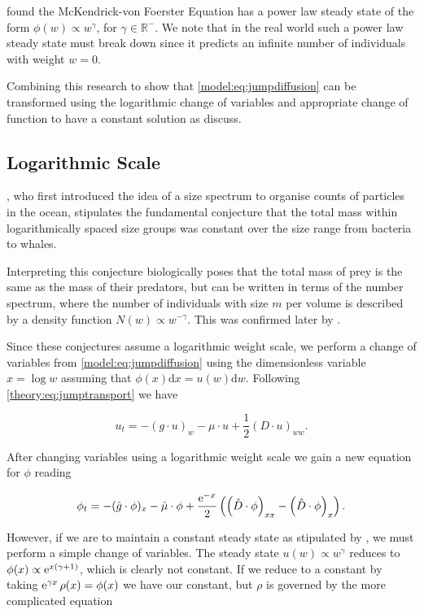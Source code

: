 \documentclass[../main]{subfiles}
\begin{document}
  \cite{benoit2004} found the McKendrick-von Foerster Equation has a power law steady state of the form $\phi(w) \propto w^{\gamma}$, for $\gamma \in \mathbb{R}^-$. We note that in the real world such a power law steady state must break down since it predicts an infinite number of individuals with weight $w = 0$.

  Combining this research to show that \autoref{model:eq:jumpdiffusion} can be transformed using the logarithmic change of variables and appropriate change of function to have a constant solution as \cite{benoit2004} discuss.

  \subsection{Logarithmic Scale}
  \cite{sheldon1967}, who first introduced the idea of a size spectrum to organise counts of particles in the ocean, stipulates the fundamental conjecture that the total mass within logarithmically spaced size groups was constant over the size range from bacteria to whales.

  Interpreting this conjecture biologically \cite{silvert1980} poses that the total mass of prey is the same as the mass of their predators, but can be written in terms of the number spectrum, where the number of individuals with size $m$ per volume is described by a density function $N(w) \propto w^{-\gamma}$. This was confirmed later by \cite{benoit2004}.

  Since these conjectures assume a logarithmic weight scale, we perform a change of variables from \autoref{model:eq:jumpdiffusion} using the dimensionless variable $x = \log{w}$ assuming that $\phi(x) \mathrm{d}x = u(w) \mathrm{d}w$. Following \autoref{theory:eq:jumptransport} we have

  \begin{equation}
    u_t = - (g \cdot u)_w - \mu \cdot u + \frac{1}{2} (D \cdot u)_{ww}.
  \end{equation}

  After changing variables using a logarithmic weight scale we gain a new equation for $\phi$ reading

  \begin{equation} \label{model:eq:logscale}
    \phi_t = - (\hat{g} \cdot \phi)_x - \hat{\mu} \cdot \phi + \frac{\operatorname{e}^{-x}}{2} \left( \left( \hat{D} \cdot \phi \right)_{xx} - \left( \hat{D} \cdot \phi \right)_x \right).
  \end{equation}

  However, if we are to maintain a constant steady state as stipulated by \cite{sheldon1967}, we must perform a simple change of variables. The steady state $u(w) \propto w^{\gamma}$ reduces to $\phi(x) \propto \operatorname{e}^{x(\gamma +1)}$, which is clearly not constant. If we reduce to a constant by taking $\operatorname{e}^{\gamma x} \rho(x) = \phi(x)$ we have our constant, but $\rho$ is governed by the more complicated equation
\end{document}

